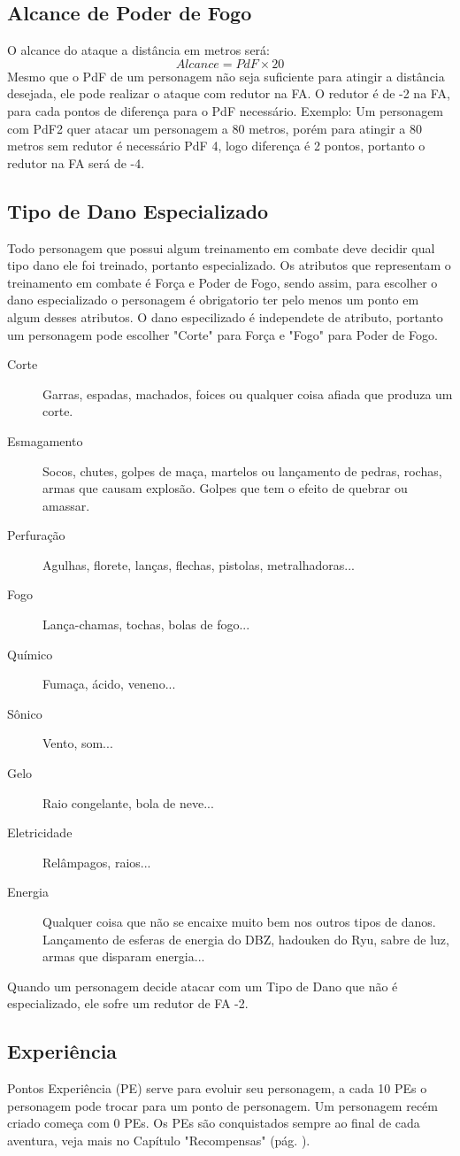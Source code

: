 \subsection{Alcance de Poder de Fogo}
O alcance do ataque a distância em metros será:
\[ Alcance = PdF \times 20 \]
Mesmo que o PdF de um personagem não seja suficiente para atingir a distância desejada, ele pode realizar o ataque com redutor na FA. O redutor é de -2 na FA, para cada pontos de diferença para o PdF necessário. Exemplo: Um personagem com PdF2 quer atacar um personagem a 80 metros, porém para atingir a 80 metros sem redutor é necessário PdF 4, logo diferença é 2 pontos, portanto o redutor na FA será de -4.

\subsection{Tipo de Dano Especializado}
Todo personagem que possui algum treinamento em combate deve decidir qual tipo dano ele foi treinado, portanto especializado. Os atributos que representam o treinamento em combate é Força e Poder de Fogo, sendo assim, para escolher o dano especializado o personagem é obrigatorio ter pelo menos um ponto em algum desses atributos. O dano especilizado é independete de atributo, portanto um personagem pode escolher "Corte" para Força e "Fogo" para Poder de Fogo.

\begin{description}
\item[Corte] Garras, espadas, machados, foices ou qualquer coisa afiada que produza um corte.
\item[Esmagamento] Socos, chutes, golpes de maça, martelos ou lançamento de pedras, rochas, armas que causam explosão. Golpes que tem o efeito de quebrar ou amassar.
\item[Perfuração] Agulhas, florete, lanças, flechas, pistolas, metralhadoras...
\item[Fogo] Lança-chamas, tochas, bolas de fogo...
\item[Químico] Fumaça, ácido, veneno...
\item[Sônico] Vento, som...
\item[Gelo] Raio congelante, bola de neve...
\item[Eletricidade] Relâmpagos, raios...
\item[Energia] Qualquer coisa que não se encaixe muito bem nos outros tipos de danos. Lançamento de esferas de energia do DBZ, hadouken do Ryu, sabre de luz, armas que disparam energia...
\end{description}

Quando um personagem decide atacar com um Tipo de Dano que não é especializado, ele sofre um redutor de FA -2.

\subsection{Experiência}

Pontos Experiência (PE) serve para evoluir seu personagem, a cada 10 PEs o personagem pode trocar para um ponto de personagem. Um personagem recém criado começa com 0 PEs. Os PEs são conquistados sempre ao final de cada aventura, veja mais no Capítulo "Recompensas" (pág. \pageref{ch:rewards}).
